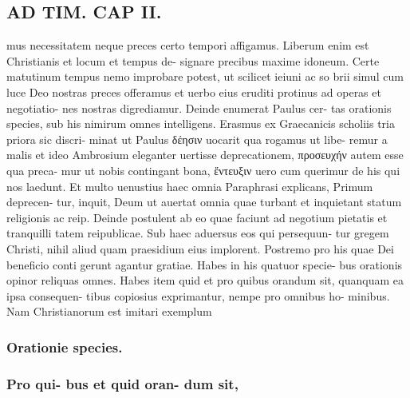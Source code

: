 \documentclass{article}
\begin{document}
\begin{pages}
\section*{AD TIM. CAP II. }
\marginpar{[ p.111 ]}\pstart mus necessitatem neque preces certo tempori affigamus. Liberum enim est Christianis et locum et tempus de- signare precibus maxime idoneum. Certe matutinum tempus nemo improbare potest, ut scilicet ieiuni ac so brii simul cum luce Deo nostras preces offeramus et uerbo eius eruditi protinus ad operas et negotiatio- nes nostras digrediamur. Deinde enumerat Paulus cer- tas orationis species, sub his nimirum omnes intelligens. Erasmus ex Graecanicis scholiis tria priora sic discri- minat ut Paulus δέησιν uocarit qua rogamus ut libe- remur a malis et ideo Ambrosium eleganter uertisse deprecationem, προσευχήν autem esse qua preca- mur ut nobis contingant bona, ἔντευξιν uero cum querimur de his qui nos laedunt. Et multo uenustius haec omnia Paraphrasi explicans, Primum deprecen- tur, inquit, Deum ut auertat omnia quae turbant et inquietant statum religionis ac reip. Deinde postulent ab eo quae faciunt ad negotium pietatis et tranquilli tatem reipublicae. Sub haec aduersus eos qui persequun- tur gregem Christi, nihil aliud quam praesidium eius implorent. Postremo pro his quae Dei beneficio conti gerunt agantur gratiae. Habes in his quatuor specie- bus orationis opinor reliquas omnes. Habes item quid et pro quibus orandum sit, quanquam ea ipsa consequen- tibus copiosius exprimantur, nempe pro omnibus ho- minibus. Nam Christianorum est imitari exemplum  \pend
\subsubsection*{Orationie species. }
\subsubsection*{Pro qui- bus et quid oran- dum sit, }

\end{pages}
\end{document}
